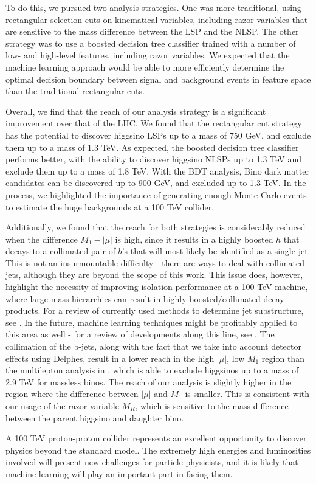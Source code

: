 To do this, we pursued two analysis strategies. One was more traditional, using rectangular selection cuts on kinematical variables, including razor variables that are sensitive to the mass difference between the LSP and the NLSP. The other strategy was to use a boosted decision tree classifier trained with a number of low- and high-level features, including razor variables. We expected that the machine learning approach would be able to more efficiently determine the optimal decision boundary between signal and background events in feature space than the traditional rectangular cuts.

Overall, we find that the reach of our analysis strategy is a significant improvement over that of the LHC. We found that the rectangular cut strategy has the potential to discover higgsino LSPs up to a mass of 750 GeV, and exclude them up to a mass of 1.3 TeV. As expected, the boosted decision tree classifier performs better, with the ability to discover higgsino NLSPs up to 1.3 TeV and exclude them up to a mass of 1.8 TeV. With the BDT analysis, Bino dark matter candidates can be discovered up to 900 GeV, and excluded up to 1.3 TeV. In the process, we highlighted the importance of generating enough Monte Carlo events to estimate the huge backgrounds at a 100 TeV collider. 

Additionally, we found that the reach for both strategies is considerably reduced when the difference $M_1 - |\mu|$ is high, since it results in a highly boosted $h$ that decays to a collimated pair of $b$'s that will most likely be identified as a single jet. This is not an insurmountable difficulty - there are ways to deal with collimated jets, although they are beyond the scope of this work. This issue does, however, highlight the necessity of improving isolation performance at a 100 TeV machine, where large mass hierarchies can result in highly boosted/collimated decay products. For a review of currently used methods to determine jet substructure, see \citep{Shelton:2013an}. In the future, machine learning techniques might be profitably applied to this area as well - for a review of developments along this line, see \citep{Schwartzman:2016jqu}. The collimation of the b-jets, along with the fact that we take into account detector effects using Delphes, result in a lower reach in the high $|\mu|$, low $M_1$ region than the multilepton analysis in \citep{Gori:2014oua}, which is able to exclude higgsinos up to a mass of 2.9 TeV for massless binos. The reach of our analysis is slightly higher in the region where the difference between $|\mu|$ and $M_1$ is smaller. This is consistent with our usage of the razor variable $M_R$, which is sensitive to the mass difference between the parent higgsino and daughter bino.

A 100 TeV proton-proton collider represents an excellent opportunity to discover physics beyond the standard model. The extremely high energies and luminosities involved will present new challenges for particle physicists, and it is likely that machine learning will play an important part in facing them. 

